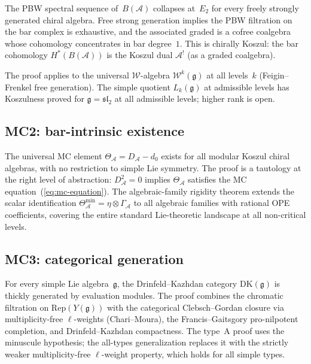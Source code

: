 \documentclass[11pt,reqno]{amsart}
\theoremstyle{definition}
\theoremstyle{remark}
\newcommand{\cA}{\mathcal{A}}
\newcommand{\fg}{\mathfrak{g}}
\numberwithin{equation}{section}
\newcommand{\cW}{\mathcal{W}}
\begin{document}
The PBW spectral sequence of~$B(\cA)$ collapses at~$E_2$
for every freely strongly generated chiral algebra. Free
strong generation implies the PBW filtration on the bar
complex is exhaustive, and the associated graded is a
cofree coalgebra whose cohomology concentrates in bar
degree~$1$. This is chirally Koszul: the bar cohomology
$H^*(B(\cA))$ is the Koszul dual $\cA^!$ (as a graded
coalgebra).

The proof applies to the universal $\cW$-algebra
$\cW^k(\fg)$ at all levels~$k$ (Feigin--Frenkel free
generation). The simple quotient $L_k(\fg)$ at admissible
levels has Koszulness proved for $\fg = \mathfrak{sl}_2$
at all admissible levels; higher rank is open.

\subsection{MC2: bar-intrinsic existence}
\label{ssec:mc2}

The universal MC element $\Theta_\cA = D_\cA - d_0$
exists for all modular Koszul chiral algebras, with no
restriction to simple Lie symmetry. The proof is a
tautology at the right level of abstraction: $D_\cA^2 = 0$
implies $\Theta_\cA$ satisfies the MC
equation~(\ref{eq:mc-equation}). The algebraic-family
rigidity theorem extends the scalar identification
$\Theta_\cA^{\min} = \eta \otimes \Gamma_\cA$ to all
algebraic families with rational OPE coefficients, covering
the entire standard Lie-theoretic landscape at all
non-critical levels.

\subsection{MC3: categorical generation}
\label{ssec:mc3}

For every simple Lie algebra~$\fg$, the Drinfeld--Kazhdan
category $\mathrm{DK}(\fg)$ is thickly generated by
evaluation modules. The proof combines the chromatic
filtration on $\mathrm{Rep}(Y(\fg))$ with the categorical
Clebsch--Gordan closure via multiplicity-free
$\ell$-weights (Chari--Moura), the Francis--Gaitsgory
pro-nilpotent completion, and Drinfeld--Kazhdan
compactness. The type~A proof uses the minuscule
hypothesis; the all-types generalization replaces it with
the strictly weaker multiplicity-free $\ell$-weight
property, which holds for all simple types.
\end{document}
